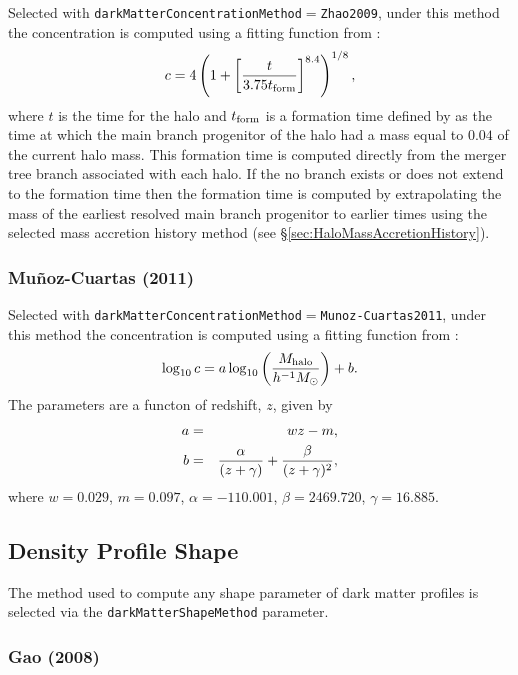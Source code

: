 Selected with {\tt darkMatterConcentrationMethod}$=${\tt Zhao2009}, under this method the concentration is computed using a fitting function from \cite{zhao_accurate_2009}:
\begin{equation}
 c = 4 \left(1 + \left[ {t  \over 3.75 t_{\rm form}}\right]^{8.4}\right)^{1/8},
\end{equation}
where $t$ is the time for the halo and $t_{\rm form}$ is a formation time defined by \cite{zhao_accurate_2009} as the time at which the main branch progenitor of the halo had a mass equal to $0.04$ of the current halo mass. This formation time is computed directly from the merger tree branch associated with each halo. If the no branch exists or does not extend to the formation time then the formation time is computed by extrapolating the mass of the earliest resolved main branch progenitor to earlier times using the selected mass accretion history method (see \S\ref{sec:HaloMassAccretionHistory}).

\subsubsection{Mu\~noz-Cuartas (2011)}

Selected with {\tt darkMatterConcentrationMethod}$=${\tt Munoz-Cuartas2011}, under this method the concentration is computed using a fitting function from \cite{munoz-cuartas_redshift_2011}:
\begin{equation}
\log_{10} c = a \log_{10} \left( {M_{\rm halo} \over h^{-1}M_\odot} \right) + b.
\end{equation}
The parameters are a functon of redshift, $z$, given by
\begin{eqnarray}
a &=& wz-m, \\
b &=& {\alpha \over (z+\gamma)} + {\beta \over (z+\gamma)^2},
\end{eqnarray}
where $w=0.029$, $m=0.097$, $\alpha=-110.001$, $\beta=2469.720$, $\gamma=16.885$.

\subsection{Density Profile Shape}\label{sec:DarkMatterProfileShape}

The method used to compute any shape parameter of dark matter profiles is selected via the {\tt darkMatterShapeMethod} parameter.

\subsubsection{Gao (2008)}

